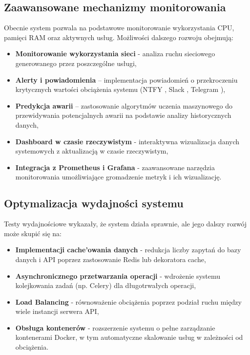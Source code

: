 \subsection{Zaawansowane mechanizmy monitorowania}
Obecnie system pozwala na podstawowe monitorowanie wykorzystania CPU, pamięci RAM oraz aktywnych usług. Możliwości dalszego rozwoju obejmują:
\begin{itemize}
    \item \textbf{Monitorowanie wykorzystania sieci} - analiza ruchu sieciowego generowanego przez poszczególne usługi,
    \item \textbf{Alerty i powiadomienia} – implementacja powiadomień o przekroczeniu krytycznych wartości obciążenia systemu (NTFY \cite{NTFY}, Slack \cite{Slack}, Telegram \cite{Telegram}),
    \item \textbf{Predykcja awarii} – zastosowanie algorytmów uczenia maszynowego do przewidywania potencjalnych awarii na podstawie analizy historycznych danych,
    \item \textbf{Dashboard w czasie rzeczywistym} - interaktywna wizualizacja danych systemowych z aktualizacją w czasie rzeczywistym,
    \item \textbf{Integracja z Prometheus i Grafana} - zaawansowane narzędzia monitorowania umożliwiające gromadzenie metryk i ich wizualizację.
\end{itemize}

\subsection{Optymalizacja wydajności systemu}
Testy wydajnościowe wykazały, że system działa sprawnie, ale jego dalszy rozwój może skupić się na:
\begin{itemize}
    \item \textbf{Implementacji cache'owania danych} - redukcja liczby zapytań do bazy danych i API poprzez zastosowanie Redis lub dekoratora cache,
    \item \textbf{Asynchronicznego przetwarzania operacji} - wdrożenie systemu kolejkowania zadań (np. Celery) dla długotrwałych operacji,
    \item \textbf{Load Balancing} - równoważenie obciążenia poprzez podział ruchu między wiele instancji serwera API,
    \item \textbf{Obsługa kontenerów} - rozszerzenie systemu o pełne zarządzanie kontenerami Docker, w tym automatyczne skalowanie usług w zależności od obciążenia.
\end{itemize}

